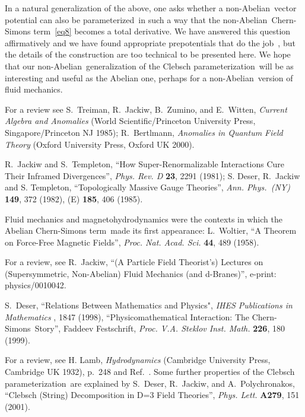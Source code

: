 \documentclass[a4paper,12pt,twoside]{article}
\providecommand{\nA}{non-Abelian}
\providecommand{\CS}{Chern-Simons}
\providecommand{\CSt}{Chern-Simons term}
\providecommand{\Cpr}{Clebsch pa\-ra\-me\-ter\-iza\-tion}
\providecommand{\prd}{para\-me\-ter\-ized}
\def\Journal#1#2#3#4{{\em #1} {\bf #2}, #3 (#4)}
\def\add#1#2#3{{\bf #1}, #2 (#3)}
\def\Book#1#2#3#4{{\em #1}  (#2, #3 #4)}
\def\PLA{Phys. Lett.} %
\def\PRD{Phys. Rev. D}
\def\AnnP{Ann. Phys.\ ({\em NY})}
\def\PNAS{Proc. Nat. Acad. Sci.}
\def\PVAS{Proc. V.A. Steklov Inst. Math.}
\begin{document}
In a natural generalization of the above, one asks whether a \nA\ vector potential
can also be \prd\ in such a way that the \nA\ \CSt~\eqref{eq8} becomes a total
derivative. We have answered this question affirmatively and we have found
appropriate prepotentials that do the job~\cite{ref10,ref13,ref14}, but the details of
the construction are too technical to be presented here. We hope that our \nA\
generalization of the \Cpr\ will be as interesting and useful as the Abelian one,
perhaps for a \nA\ version of fluid mechanics. 
 



\vspace*{-\bigskipamount}

\begin{thebibliography}{99}

\bibitem{ref6}
For a review see S.~Treiman, R.~Jackiw, B.~Zumino, and E.~Witten, \Book{Current
Algebra and Anomalies}{World Scientific/Princeton University
Press}{Singapore/Princeton NJ}{1985}; R.~Bertlmann, \Book{Anomalies in
Quantum Field Theory}{Oxford University Press}{Oxford UK}{2000}. 


\bibitem{ref7}
R.~Jackiw and S.~Templeton, ``How Super-Renormalizable Interactions Cure
Their Inframed Divergences'', \Journal{\PRD}{23}{2291}{1981}; 
S. Deser, R.~Jackiw and S. Templeton, ``Topologically Massive Gauge Theories'',
\Journal{\AnnP}{149}{372}{1982}, (E)
\add{185}{406}{1985}.

\bibitem{ref8}
Fluid mechanics and magnetohydrodynamics were the contexts in which the Abelian
\CSt\ made its first appearance: L.~Woltier, ``A Theorem on Force-Free Magnetic
Fields'',  \Journal{\PNAS}{44}{489}{1958}.


\bibitem{ref10}
For a review, see R.~Jackiw, ``(A Particle Field Theorist's) Lectures on
(Supersymmetric, Non-Abelian) Fluid Mechanics (and d-Branes)'',
e-print: physics/0010042. 

\bibitem{ref9}
S.~Deser, 
``Relations Between Mathematics and Physics",  \Journal{IHES Publications in
Mathematics}{\!}{1847}{1998},  ``Physicomathematical Interaction: The \CS\ Story'',
Faddeev Fest\-schrift,
\Journal{\PVAS}{226}{180}{1999}.



For a review, see H. Lamb, \Book{Hydrodynamics}{Cambridge University
Press}{Cambridge UK}{1932}, p.~248 and Ref.~\cite{ref10}. Some further properties of
the \Cpr\ are explained by S.~Deser, R.~Jackiw, and A.~Polychronakos, ``Clebsch
(String) Decomposition in D=3 Field Theories'', \Journal{\PLA}{A279}{151}{2001}.


\end{thebibliography}
\end{document}
